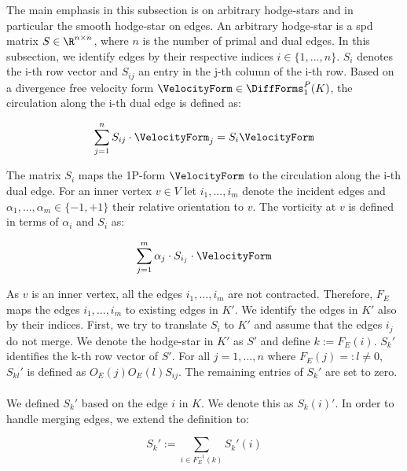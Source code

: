 \eproof


The main emphasis in this subsection is on arbitrary hodge-stars and in particular the smooth
hodge-star on edges.
An arbitrary hodge-star is a spd matrix $S \in \R^{n \times n}$, where $n$ is the number
of primal and dual edges.
In this subsection, we identify edges by their respective indices $i \in \{ 1 , ... , n \}$.
$S_i$ denotes the i-th row vector and $S_{ij}$ an entry in the j-th column of the i-th row.
Based on a divergence free velocity form $\VelocityForm \in \DiffForms^P_1(K)$, the circulation along the i-th dual edge is defined as:

\begin{equation}
\sum_{j=1}^n S_{ij} \cdot \VelocityForm_j = S_i \VelocityForm
\end{equation}

The matrix $S_i$ maps the 1P-form $\VelocityForm$ to the circulation along the i-th dual edge.
For an inner vertex $v \in V$ let $i_1, ... , i_m$ denote the incident edges and
$\alpha_1 , ... , \alpha_m \in \{-1,+1\}$ their relative orientation to $v$.
The vorticity at $v$ is defined in terms of $\alpha_i$ and $S_i$ as:

\begin{equation}
\sum_{j=1}^m \alpha_j \cdot S_{i_j} \cdot \VelocityForm
\end{equation}

As $v$ is an inner vertex, all the edges $i_1,...,i_m$ are not contracted.
Therefore, $F_E$ maps the edges $i_1,...,i_m$ to existing edges in $K'$.
We identify the edges in $K'$ also by their indices.
First, we try to translate $S_i$ to $K'$ and assume that the edges $i_j$ do not merge.
We denote the hodge-star in $K'$ as $S'$ and define $k := F_E(i)$.
$S_k'$ identifies the k-th row vector of $S'$.
For all $j = 1,...,n$ where $F_E(j) =: l \neq 0$, $S_{kl}'$ is defined as
$O_E(j) O_E(l) S_{ij}$. The remaining entries of $S_k'$ are set to zero.

\paragraph*{}
We defined $S_k'$ based on the edge $i$ in $K$. We denote this as $S_k(i)'$.
In order to handle merging edges, we extend the definition to:

\begin{equation}
S_k' := \sum_{i \in F^{-1}_E(k)} S_k'(i)
\end{equation}

